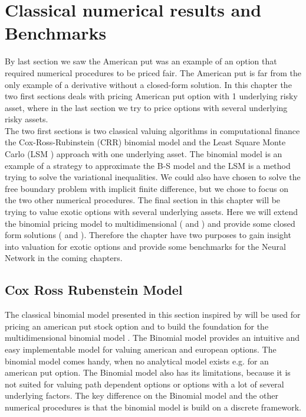 
\chapter{Classical numerical results and Benchmarks} %

\label{Chapter3} %

By last section we saw the American put was an example of an option that required numerical procedures to be priced fair. The American put is far from the only example of a derivative without a closed-form solution. In this chapter the two first sections deals with pricing American put option with 1 underlying risky asset, where in the last section we try to price options with several underlying risky assets. \\

The two first sections is two classical valuing algorithms in computational finance the Cox-Ross-Rubinstein (CRR) binomial model \parencite{CRR} and the Least Square Monte Carlo (LSM \parencite{lsm}) approach with one underlying asset. The binomial model is an example of a strategy to approximate the B-S model and the LSM is a method trying to solve the variational inequalities. We could also have chosen to solve the free boundary problem with implicit finite difference, but we chose to focus on the two other numerical procedures. The final section in this chapter will be trying to value exotic options with several underlying assets. Here we will extend the binomial pricing model to multidimensional (\parencite{NEK} and \parencite{BEG}) and provide some closed form solutions (\parencite{Johnson87} and \parencite{Ouwehand2006}). Therefore the chapter have two purposes to gain insight into valuation for exotic options and provide some benchmarks for the Neural Network in the coming chapters.

\section{Cox Ross Rubenstein Model}\label{CRR}
The classical binomial model presented in this section inspired by \parencite{CRR} \parencite{Hull} \parencite{finKont} will be used for pricing an american put stock option and to build the foundation for the multidimensional binomial model \parencite{BEG}. The Binomial model provides an intuitive and easy implementable model for valuing american and european options. The binomial model comes handy, when no analytical model exists e.g. for an american put option. The Binomial model also has its limitations, because it is not suited for valuing path dependent options or options with a lot of several underlying factors. The key difference on the Binomial model and the other numerical procedures is that the binomial model is build on a discrete framework. \\


